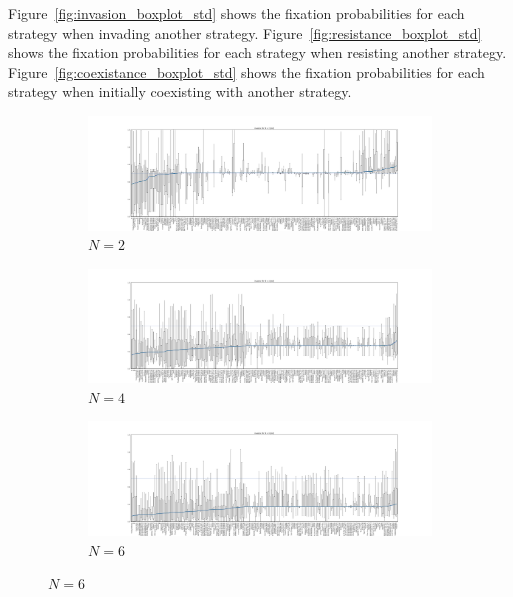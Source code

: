 \documentclass{article}
\begin{document}
Figure~\ref{fig:invasion_boxplot_std} shows the fixation probabilities for each
strategy when invading another strategy.
Figure~\ref{fig:resistance_boxplot_std} shows the fixation probabilities for
each strategy when resisting another strategy.
Figure~\ref{fig:coexistance_boxplot_std} shows the fixation probabilities for
each strategy when initially coexisting with another strategy.

\begin{figure}[!hbtp]
    \centering
    \begin{subfigure}[t]{\textwidth}
        \centering
        \includegraphics[width=\textwidth]{../img/invasion_boxplot_2_std.pdf}
        \caption{\(N=2\)}
    \end{subfigure}%

    \begin{subfigure}[t]{\textwidth}
        \centering
        \includegraphics[width=\textwidth]{../img/invasion_boxplot_4_std.pdf}
        \caption{\(N=4\)}
    \end{subfigure}%

    \begin{subfigure}[t]{\textwidth}
        \centering
        \includegraphics[width=\textwidth]{../img/invasion_boxplot_6_std.pdf}
        \caption{\(N=6\)}
    \end{subfigure}%


\end{figure}
\end{document}
